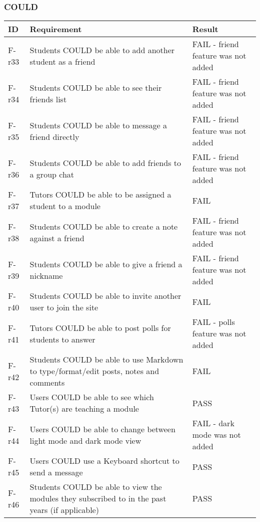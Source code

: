 \subsubsection{COULD}

\begin{tabular}{|p{1cm}|p{10cm}|p{3cm}|}
    \hline
        \textbf{ID} & \textbf{Requirement} & \textbf{Result} \\
    \hline
    F-r33 &
    Students COULD be able to add another student as a friend & 
    FAIL - friend feature was not added \\
    \hline
    F-r34 &
    Students COULD be able to see their friends list & 
    FAIL - friend feature was not added \\
    \hline
    F-r35 &
    Students COULD be able to message a friend directly & 
    FAIL - friend feature was not added \\
    \hline
    F-r36 &
    Students COULD be able to add friends to a group chat & 
    FAIL - friend feature was not added \\
    \hline
    F-r37 &
    Tutors COULD be able to be assigned a student to a module & 
    FAIL \\
    \hline
    F-r38 &
    Students COULD be able to create a note against a friend & 
    FAIL - friend feature was not added \\
    \hline
    F-r39 &
    Students COULD be able to give a friend a nickname & 
    FAIL - friend feature was not added \\
    \hline
    F-r40 &
    Students COULD be able to invite another user to join the site & 
    FAIL \\
    \hline
    F-r41 &
    Tutors COULD be able to post polls for students to answer & 
    FAIL - polls feature was not added \\
    \hline
    F-r42 &
    Students COULD be able to use Markdown to type/format/edit posts, notes and comments & 
    FAIL \\
    \hline
    F-r43 &
    Users COULD be able to see which Tutor(s) are teaching a module & 
    PASS \\
    \hline
    F-r44 &
    Users COULD be able to change between light mode and dark mode view & 
    FAIL - dark mode was not added \\
    \hline
    F-r45 &
    Users COULD use a Keyboard shortcut to send a message & 
    PASS \\
    \hline
    F-r46 &
    Students COULD be able to view the modules they subscribed to in the past years (if applicable) & 
    PASS \\
    \hline
\end{tabular}
    
